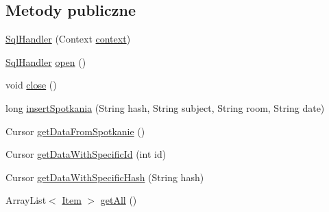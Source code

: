 \subsection*{Metody publiczne}
\begin{DoxyCompactItemize}
\item 
\hyperlink{classcom_1_1example_1_1qrpoll_1_1_sql_handler_a53ed47985d1fc8282e594bd646d10f10}{Sql\+Handler} (Context \hyperlink{classcom_1_1example_1_1qrpoll_1_1_sql_handler_ab0071f750233a8b37790758a430d847c}{context})
\item 
\hyperlink{classcom_1_1example_1_1qrpoll_1_1_sql_handler}{Sql\+Handler} \hyperlink{classcom_1_1example_1_1qrpoll_1_1_sql_handler_a8ff4b44bac212ce1711edd40331c5f3a}{open} ()
\item 
void \hyperlink{classcom_1_1example_1_1qrpoll_1_1_sql_handler_afab084d101af94d630e4cad2e2d0aad6}{close} ()
\item 
long \hyperlink{classcom_1_1example_1_1qrpoll_1_1_sql_handler_a277e4b5d26c99949e13a5a522662f579}{insert\+Spotkania} (String hash, String subject, String room, String date)
\item 
Cursor \hyperlink{classcom_1_1example_1_1qrpoll_1_1_sql_handler_a36835546e39ab97bd1473650c86eebfb}{get\+Data\+From\+Spotkanie} ()
\item 
Cursor \hyperlink{classcom_1_1example_1_1qrpoll_1_1_sql_handler_a75a37c2aaac5411dd77de0df7b07acc7}{get\+Data\+With\+Specific\+Id} (int id)
\item 
Cursor \hyperlink{classcom_1_1example_1_1qrpoll_1_1_sql_handler_a2c5fa84b5eb6c9f28e1519c663501e60}{get\+Data\+With\+Specific\+Hash} (String hash)
\item 
Array\+List$<$ \hyperlink{classcom_1_1example_1_1qrpoll_1_1_item}{Item} $>$ \hyperlink{classcom_1_1example_1_1qrpoll_1_1_sql_handler_ab6085ad33e5f50aa8c3d84d35f62728c}{get\+All} ()
\end{DoxyCompactItemize}
